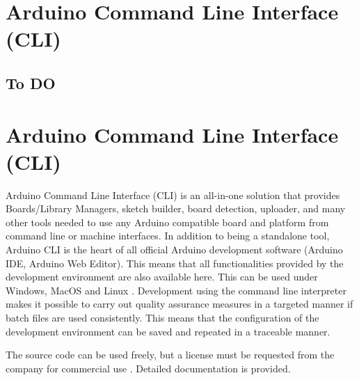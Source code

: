 %
%
%



\chapter{Arduino Command Line Interface (CLI)}


\section{To DO}









\chapter{Arduino Command Line Interface (CLI)}

Arduino Command Line Interface (CLI) is an all-in-one solution that provides Boards/Library Managers, sketch builder, board detection, uploader, and many other tools needed to use any Arduino compatible board and platform from command line or machine interfaces.
In addition to being a standalone tool, Arduino CLI is the heart of all official Arduino development software (Arduino IDE, Arduino Web Editor). This means that all functionalities provided by the development environment are also available here. This can be used under Windows, MacOS and Linux \cite{ArduinoCLIpro:2024}. Development using the command line interpreter makes it possible to carry out quality assurance measures in a targeted manner if batch files are used consistently. This means that the configuration of the development environment can be saved and repeated in a traceable manner.


The source code can be used freely, but a license must be requested from the company for commercial use \cite{ArduinoCLIGit:2024}. Detailed documentation is provided. \cite{ArduinoCLIDoc:2024}

